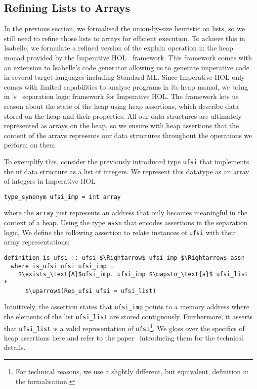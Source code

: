 \documentclass[
  sigplan,
  10pt,
  anonymous,
  review,
  ]{acmart}
\newcommand{\opexplain}{explain}
\begin{document}
\subsection{Refining Lists to Arrays\label{sec:imperative_hol}}
In the previous section, we formalised the union-by-size heuristic on lists,
so we still need to refine those lists to arrays for efficient execution. 
To achieve this in Isabelle, we formulate a refined version of the \opexplain{} operation in the heap monad provided by the Imperative HOL~\cite{imperative_hol} framework.
This framework comes with an extension to Isabelle's code generator allowing us to generate imperative code in several target languages including Standard ML. 
Since Imperative HOL only comes with limited capabilities to analyse programs in its heap monad, 
we bring in \citeauthor{uf_isabelle}'s~\cite{uf_isabelle} separation logic framework for Imperative HOL.
The framework lets us reason about the state of the heap using heap assertions, which describe data stored on the heap and their properties.
All our data structures are ultimately represented as arrays on the heap,
so we ensure with heap assertions that the content of the arrays represents our data structures throughout the operations we perform on them. 

To exemplify this, consider the previously introduced type \lstinline|ufsi| that implements the \acrshort{uf} data structure as a list of integers.
We represent this datatype as an array of integers in Imperative HOL
\begin{lstlisting}
type_synonym ufsi_imp = int array
\end{lstlisting}
where the \lstinline|array| just represents an address that only becomes meaningful in the context of a heap.
Using the type \lstinline|assn| that encodes assertions in the separation logic, We define the following assertion to relate instances of \lstinline|ufsi| with their array representations:
\begin{lstlisting}
definition is_ufsi :: ufsi $\Rightarrow$ ufsi_imp $\Rightarrow$ assn
  where is_ufsi ufsi ufsi_imp =
    $\exists_\text{A}$ufsi_imp. ufsi_imp $\mapsto_\text{a}$ ufsi_list *
      $\uparrow$(Rep_ufsi ufsi = ufsi_list)
\end{lstlisting}
Intuitively, the assertion states that \lstinline|ufsi_imp| points to a memory address where the elements of the list \lstinline|ufsi_list| are stored contiguously.
Furthermore, it asserts that \lstinline|ufsi_list| is a valid representation of \lstinline|ufsi|\footnote{For technical reasons, we use a slightly different, but equivalent, definition in the formalisation.}. 
We gloss over the specifics of heap assertions here and refer to the paper~\cite{uf_isabelle} introducing them for the technical details. 
\end{document}

